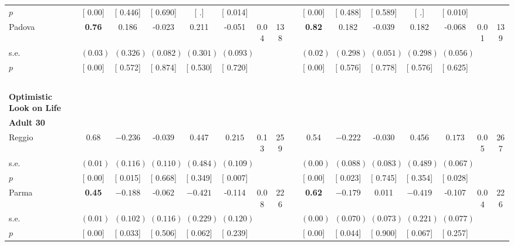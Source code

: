 \begin{longtable}{L{8em} c c c c c c c p{1em} c c c c c c c}
\quad \quad \quad \quad $ p$ & [     0.00] & [    0.446] & [    0.690] & [        .] & [    0.014] & & & & [     0.00] & [    0.488] & [    0.589] & [        .] & [    0.010] & &  \\[1em]
\quad \quad \quad Padova& \textbf{     0.76} &     0.186 &    -0.023 &     0.211 &    -0.051 &      0.04 &       138 & & \textbf{     0.82} &     0.182 &    -0.039 &     0.182 &    -0.068 &      0.01 &       139  \\*
\quad \quad \quad \quad s.e.& $ (     0.03)$ & $ (    0.326)$ & $ (    0.082)$ & $ (    0.301)$ & $ (    0.093)$ & & & & $ (     0.02)$ & $ (    0.298)$ & $ (    0.051)$ & $ (    0.298)$ & $ (    0.056)$ & &  \\*
\quad \quad \quad \quad $ p$ & [     0.00] & [    0.572] & [    0.874] & [    0.530] & [    0.720] & & & & [     0.00] & [    0.576] & [    0.778] & [    0.576] & [    0.625] & &  \\[1em]
~\\[1em]
\textbf{Optimistic Look on Life} \\*
\quad \quad \textbf{Adult 30} & & & & & & & & & & & & & & & \\* 
\quad \quad \quad Reggio& 0.68 & $ \mathbf{   -0.236}$ &    -0.039 &     0.447 & $ \mathbf{    0.215}$ &      0.13 &       259 & & 0.54 & $ \mathbf{   -0.222}$ &    -0.030 &     0.456 & $ \mathbf{    0.173}$ &      0.05 &       267  \\*
\quad \quad \quad \quad s.e.& $ (     0.01)$ & $ (    0.116)$ & $ (    0.110)$ & $ (    0.484)$ & $ (    0.109)$ & & & & $ (     0.00)$ & $ (    0.088)$ & $ (    0.083)$ & $ (    0.489)$ & $ (    0.067)$ & &  \\*
\quad \quad \quad \quad $ p$ & [     0.00] & [    0.015] & [    0.668] & [    0.349] & [    0.007] & & & & [     0.00] & [    0.023] & [    0.745] & [    0.354] & [    0.028] & &  \\[1em]
\quad \quad \quad Parma& \textbf{     0.45} & $ \mathbf{   -0.188}$ &    -0.062 & $ \mathbf{   -0.421}$ &    -0.114 &      0.08 &       226 & & \textbf{     0.62} & $ \mathbf{   -0.179}$ &     0.011 & $ \mathbf{   -0.419}$ &    -0.107 &      0.04 &       226  \\*
\quad \quad \quad \quad s.e.& $ (     0.01)$ & $ (    0.102)$ & $ (    0.116)$ & $ (    0.229)$ & $ (    0.120)$ & & & & $ (     0.00)$ & $ (    0.070)$ & $ (    0.073)$ & $ (    0.221)$ & $ (    0.077)$ & &  \\*
\quad \quad \quad \quad $ p$ & [     0.00] & [    0.033] & [    0.506] & [    0.062] & [    0.239] & & & & [     0.00] & [    0.044] & [    0.900] & [    0.067] & [    0.257] & &  \\[1em]

\end{longtable}
